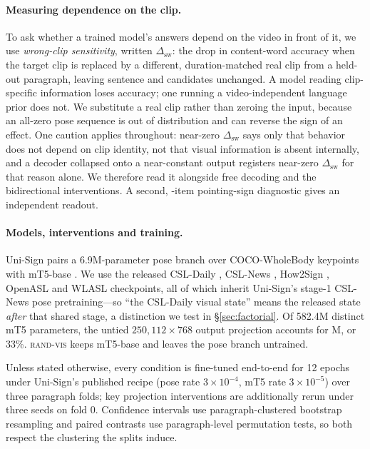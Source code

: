 \documentclass[11pt]{article}
\begin{document}
\paragraph{Measuring dependence on the clip.}
To ask whether a trained model's answers depend on the video in front of it, we
use \emph{wrong-clip sensitivity}, written $\Delta_{\mathrm{sw}}$: the drop in
content-word accuracy when the target clip is replaced by a different,
duration-matched real clip from a held-out paragraph, leaving sentence and
candidates unchanged. A model reading clip-specific information loses accuracy;
one running a video-independent language prior does not. We substitute a real
clip rather than zeroing the input, because an all-zero pose sequence is out of
distribution and can reverse the sign of an effect. One caution applies
throughout: near-zero $\Delta_{\mathrm{sw}}$ says only that behavior does not
depend on clip identity, not that visual information is absent internally, and a
decoder collapsed onto a near-constant output registers near-zero
$\Delta_{\mathrm{sw}}$ for that reason alone. We therefore read it alongside free
decoding and the bidirectional interventions. A second, \ItemsN-item
pointing-sign diagnostic gives an independent readout.

\paragraph{Models, interventions and training.}
Uni-Sign pairs a 6.9M-parameter pose branch over COCO-WholeBody keypoints
\citep{cocowholebody,rtmpose} with mT5-base \citep{mt5}. We use the released
CSL-Daily \citep{csldaily}, CSL-News \citep{unisign}, How2Sign \citep{how2sign},
OpenASL \citep{openasl} and WLASL \citep{wlasl} checkpoints, all of which inherit
Uni-Sign's stage-1 CSL-News pose pretraining---so ``the CSL-Daily visual state''
means the released state \emph{after} that shared stage, a distinction we test in
\S\ref{sec:factorial}. Of 582.4M distinct mT5 parameters, the untied
$250{,}112\times768$ output projection accounts for \HeadParamsM{}M, or 33\%.
\textsc{rand-vis} keeps mT5-base and leaves the pose branch untrained.

Unless stated otherwise, every condition is fine-tuned end-to-end for 12 epochs
under Uni-Sign's published recipe (pose rate $3\times10^{-4}$, mT5 rate
$3\times10^{-5}$) over three paragraph folds; key projection interventions are
additionally rerun under three seeds on fold 0. Confidence intervals use
paragraph-clustered bootstrap resampling and paired contrasts use
paragraph-level permutation tests, so both respect the clustering the splits
induce.
\end{document}

